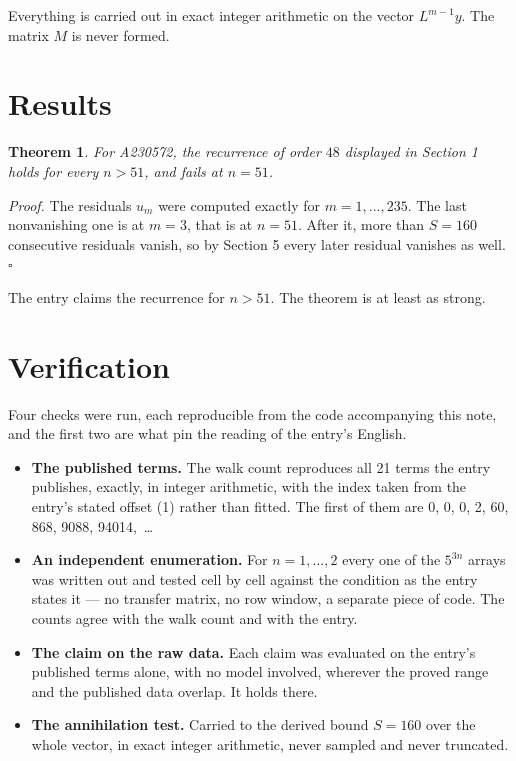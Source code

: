 \documentclass[11pt]{article}
\newtheorem{theorem}{Theorem}
\theoremstyle{definition}
\begin{document}
Everything is carried out in exact integer arithmetic on the vector $L^{m-1}y$. The matrix $M$ is never formed.

\section{Results}

\begin{theorem} For A230572, the recurrence of order $48$ displayed in Section 1 holds for every $n > 51$, and fails at $n = 51$.\end{theorem}

{\itshape Proof.} The residuals $u_m$ were computed exactly for $m = 1,\dots,235$. The last nonvanishing one is at $m = 3$, that is at $n = 51$. After it, more than $S = 160$ consecutive residuals vanish, so by Section 5 every later residual vanishes as well. $\square$

The entry claims the recurrence for $n > 51$. The theorem is at least as strong.

\section{Verification}

Four checks were run, each reproducible from the code accompanying this note, and the first two are what pin the reading of the entry's English.

\begin{itemize}

\item {\bfseries The published terms.} The walk count reproduces all 21 terms the entry publishes, exactly, in integer arithmetic, with the index taken from the entry's stated offset (1) rather than fitted. The first of them are 0, 0, 0, 2, 60, 868, 9088, 94014,~\dots

\item {\bfseries An independent enumeration.} For $n = 1,\dots,2$ every one of the $5^{3n}$ arrays was written out and tested cell by cell against the condition as the entry states it --- no transfer matrix, no row window, a separate piece of code. The counts agree with the walk count and with the entry.

\item {\bfseries The claim on the raw data.} Each claim was evaluated on the entry's published terms alone, with no model involved, wherever the proved range and the published data overlap. It holds there.

\item {\bfseries The annihilation test.} Carried to the derived bound $S = 160$ over the whole vector, in exact integer arithmetic, never sampled and never truncated.

\end{itemize}
\end{document}
